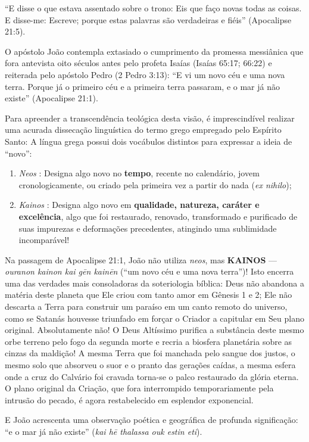 \documentclass[11pt,a4paper,openany]{book}
\begin{document}
``E disse o que estava assentado sobre o trono: Eis que faço novas todas as coisas. E disse-me: Escreve; porque estas palavras são verdadeiras e fiéis'' (Apocalipse 21:5).

O apóstolo João contempla extasiado o cumprimento da promessa messiânica que fora antevista oito séculos antes pelo profeta Isaías (Isaías 65:17; 66:22) e reiterada pelo apóstolo Pedro (2 Pedro 3:13):
``E vi um novo céu e uma nova terra. Porque já o primeiro céu e a primeira terra passaram, e o mar já não existe'' (Apocalipse 21:1).

Para apreender a transcendência teológica desta visão, é imprescindível realizar uma acurada dissecação linguística do termo grego empregado pelo Espírito Santo:
A língua grega possui dois vocábulos distintos para expressar a ideia de ``novo'':
\begin{enumerate}
  \item \textit{Neos} : Designa algo novo no \textbf{tempo}, recente no calendário, jovem cronologicamente, ou criado pela primeira vez a partir do nada (\textit{ex nihilo});
  \item \textit{Kainos} : Designa algo novo em \textbf{qualidade, natureza, caráter e excelência}, algo que foi restaurado, renovado, transformado e purificado de suas impurezas e deformações precedentes, atingindo uma sublimidade incomparável!
\end{enumerate}


Na passagem de Apocalipse 21:1, João não utiliza \textit{neos}, mas \textbf{KAINOS} — \textit{ouranon kainon kai gēn kainēn} (``um novo céu e uma nova terra'')!
Isto encerra uma das verdades mais consoladoras da soteriologia bíblica: Deus não abandona a matéria deste planeta que Ele criou com tanto amor em Gênesis 1 e 2; Ele não descarta a Terra para construir um paraíso em um canto remoto do universo, como se Satanás houvesse triunfado em forçar o Criador a capitular em Seu plano original.
Absolutamente não! O Deus Altíssimo purifica a substância deste mesmo orbe terreno pelo fogo da segunda morte e recria a biosfera planetária sobre as cinzas da maldição! A mesma Terra que foi manchada pelo sangue dos justos, o mesmo solo que absorveu o suor e o pranto das gerações caídas, a mesma esfera onde a cruz do Calvário foi cravada torna-se o palco restaurado da glória eterna. O plano original da Criação, que fora interrompido temporariamente pela intrusão do pecado, é agora restabelecido em esplendor exponencial.

E João acrescenta uma observação poética e geográfica de profunda significação:
``e o mar já não existe'' (\textit{kai hē thalassa ouk estin eti}).
\end{document}
